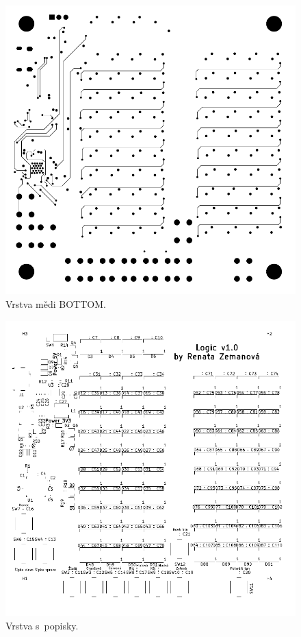   \begin{figure}[!h]
    \begin{center}
      \includegraphics[scale=0.9]{prilohy/Verze1_vrstva_Cu_BOTTOM.png}
    \end{center}
    \caption[Vrstva mědi BOTTOM]{Vrstva mědi BOTTOM.}
  \end{figure}

  \begin{figure}[!h]
    \begin{center}
      \includegraphics[scale=0.9]{prilohy/Verze1_vrstva_popisky_TOP.png}
    \end{center}
    \caption[Vrstva s~popisky]{Vrstva s~popisky.}
  \end{figure}

